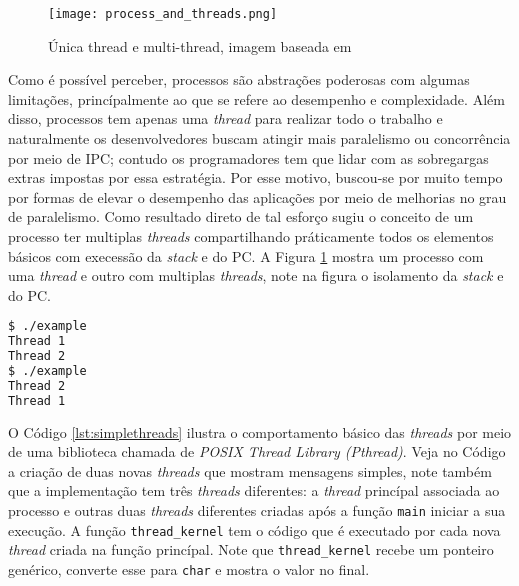 \begin{figure}[!h]
  \centering
  \texttt{[image: process\_and\_threads.png]}
  \caption{Única thread e multi-thread, imagem baseada em \cite{silberschatz}}
  \label{fig:single_thread_multi_thread}
\end{figure}

Como é possível perceber, processos são abstrações poderosas com algumas
limitações, princípalmente ao que se refere ao desempenho e complexidade. Além
disso, processos tem apenas uma \emph{thread} para realizar todo o trabalho e
naturalmente os desenvolvedores buscam atingir mais paralelismo ou concorrência
por meio de IPC; contudo os programadores tem que lidar com as sobregargas
extras impostas por essa estratégia. Por esse motivo, buscou-se por muito tempo
por formas de elevar o desempenho das aplicações por meio de melhorias no grau
de paralelismo. Como resultado direto de tal esforço sugiu o conceito de um
processo ter multiplas \emph{threads} compartilhando práticamente todos os
elementos básicos com execessão da \emph{stack} e do PC. A Figura
\ref{fig:single_thread_multi_thread} mostra um processo com uma \emph{thread} e
outro com multiplas \emph{threads}, note na figura o isolamento da \emph{stack}
e do PC.



\begin{lstlisting}[frame=single,
                   language=bash,
                   caption={Saída do exemplo de threads},
                   label={lst:simpleThreadOutput}]
$ ./example 
Thread 1 
Thread 2
$ ./example
Thread 2 
Thread 1
\end{lstlisting}

O Código \ref{lst:simplethreads} ilustra o comportamento básico das
\emph{threads} por meio de uma biblioteca chamada de \emph{POSIX Thread Library
(Pthread)}. Veja no Código a criação de duas novas \emph{threads} que mostram
mensagens simples, note também que a implementação tem três \emph{threads}
diferentes: a \emph{thread} princípal associada ao processo e outras duas
\emph{threads} diferentes criadas após a função \texttt{main} iniciar a sua
execução. A função \texttt{thread\_kernel} tem o código que é executado por
cada nova \emph{thread} criada na função princípal. Note que
\texttt{thread\_kernel} recebe um ponteiro genérico, converte esse para
\texttt{char} e mostra o valor
no final.

